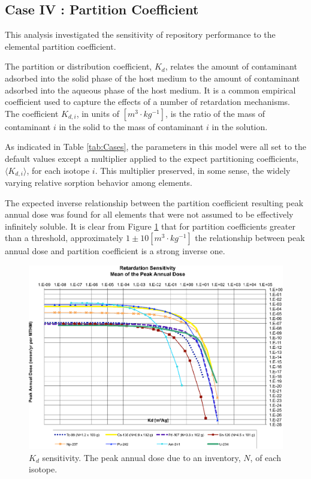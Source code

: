 
\subsection{Case IV : Partition Coefficient}

This analysis investigated the sensitivity of repository performance
to the elemental partition coefficient. 

The partition or distribution coefficient, $K_d$, relates the amount of contaminant adsorbed into the 
solid phase of the host medium to the amount of contaminant adsorbed into the 
aqueous phase of the host medium. It is a common empirical coefficient used to 
capture the effects of a number of retardation mechanisms. The coefficient 
$K_{d,i}$, in units of $[m^3\cdot kg^{-1}]$, is the ratio of the mass of 
contaminant $i$ in the solid to the mass of contaminant $i$ in the solution.

As indicated in Table \ref{tab:Cases}, the parameters in this model were all set 
to the default values except a multiplier applied to the expect partitioning 
coefficients, $\langle K_{d,i} \rangle$, for each isotope $i$. This multiplier 
preserved, in some sense, the widely varying 
relative sorption behavior among elements. 

The expected inverse relationship between the partition coefficient resulting 
peak annual dose was found for all elements that were not assumed to be 
effectively infinitely soluble.  It is clear from Figure \ref{fig:KdSum} that 
for partition coefficients greater than a threshold, approximately 
  $1\pm10[m^3\cdot kg^{-1}]$ the relationship between 
peak annual dose and partition coefficient is a strong inverse one. 

\begin{figure}[ht]
  \centering
  \includegraphics[width=\linewidth]{./images/Partitioning_Summary.eps}
  \caption{$K_d$ sensitivity.  The peak annual dose due to an inventory, 
  $N$, of each isotope.}
  \label{fig:KdSum}
\end{figure}

